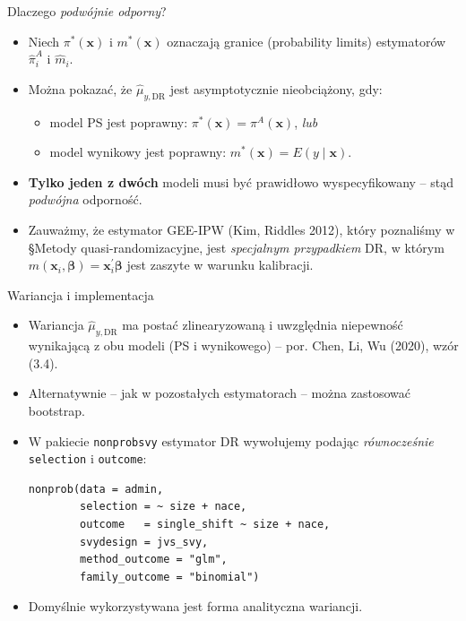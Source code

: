 \documentclass[10pt,ignorenonframetext, aspectratio=169]{beamer}
\newcommand{\bx}{\boldsymbol{x}}
\newcommand{\bbeta}{\boldsymbol{\beta}}
\begin{document}
\begin{frame}{Dlaczego \emph{podwójnie odporny}?}
\begin{itemize}
\justifying
    \item Niech $\pi^*(\bx)$ i $m^*(\bx)$ oznaczają granice (probability limits) estymatorów $\hat{\pi}_i^A$ i $\hat{m}_i$.
    \item Można pokazać, że $\hat{\mu}_{y,\text{DR}}$ jest asymptotycznie nieobciążony, gdy:
    \begin{itemize}
        \item[(a)] model PS jest poprawny: $\pi^*(\bx) = \pi^A(\bx)$, \emph{lub}
        \item[(b)] model wynikowy jest poprawny: $m^*(\bx) = E(y\mid \bx)$.
    \end{itemize}
    \item \textbf{Tylko jeden z dwóch} modeli musi być prawidłowo wyspecyfikowany -- stąd \emph{podwójna} odporność.
    \item Zauważmy, że estymator GEE-IPW (Kim, Riddles 2012), który poznaliśmy w \S Metody quasi-randomizacyjne, jest \emph{specjalnym przypadkiem} DR, w którym $m(\bx_i, \bbeta) = \bx_i^{\prime}\bbeta$ jest zaszyte w warunku kalibracji.
\end{itemize}
\end{frame}

\begin{frame}[fragile]{Wariancja i implementacja}
\begin{itemize}
\justifying
    \item Wariancja $\hat{\mu}_{y,\text{DR}}$ ma postać zlinearyzowaną i uwzględnia niepewność wynikającą z obu modeli (PS i wynikowego) -- por. Chen, Li, Wu (2020), wzór (3.4).
    \item Alternatywnie -- jak w pozostałych estymatorach -- można zastosować bootstrap.
    \item W pakiecie \texttt{nonprobsvy} estymator DR wywołujemy podając \emph{równocześnie} \texttt{selection} i \texttt{outcome}:
\begin{verbatim}
nonprob(data = admin,
        selection = ~ size + nace,
        outcome   = single_shift ~ size + nace,
        svydesign = jvs_svy,
        method_outcome = "glm",
        family_outcome = "binomial")
\end{verbatim}
    \item Domyślnie wykorzystywana jest forma analityczna wariancji.
\end{itemize}
\end{frame}
\end{document}
